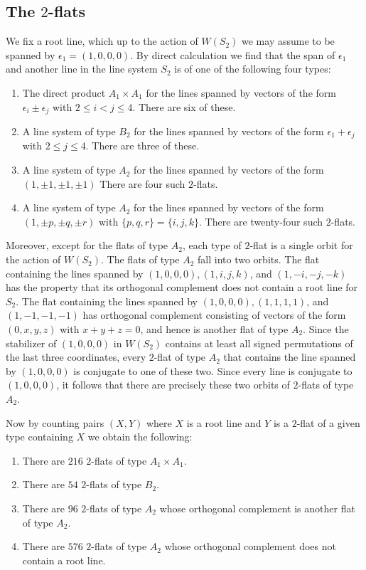 \documentclass[11pt, reqno]{amsart}
\numberwithin{equation}{section}
\theoremstyle{definition}
\theoremstyle{plain}
\begin{document}
\subsection{The $2$-flats} We fix a root line, which up to the action of $W(S_2)$ we may assume to be spanned by $\epsilon_1=(1,0,0,0)$. By direct calculation we find that the span of $\epsilon_1$ and another line in the line system $S_2$ is of one of the following four types:
\begin{enumerate}
\item[(a)] The direct product $A_1 \times A_1$ for the lines spanned by vectors of the form $\epsilon_i \pm \epsilon_j$ with $2 \leq i < j \leq 4$. There are six of these.
\item[(b)] A line system of type $B_2$ for the lines spanned by vectors of the form $\epsilon_1 + \epsilon_j$ with $2 \leq j \leq 4$. There are three of these.
\item[(c)] A line system of type $A_2$ for the lines spanned by vectors of the form $(1,\pm 1,\pm 1, \pm 1)$  There are four such $2$-flats.
\item[(d)] A line system of type $A_2$ for the lines spanned by vectors of the form $(1, \pm p,\pm q,\pm r)$ with $\{p,q,r\}=\{i,j,k\}$. There are twenty-four such $2$-flats.
\end{enumerate} Moreover, except for the flats of type $A_2$, each type of $2$-flat is a single orbit for the action of $W(S_2)$. The flats of type $A_2$ fall into two orbits. The flat containing the lines spanned by $(1,0,0,0),(1,i,j,k)$, and $(1,-i,-j,-k)$ has the property that its orthogonal complement does not contain a root line for $S_2$. The flat containing the lines spanned by $(1,0,0,0),(1,1,1,1)$, and $(1,-1,-1,-1)$ has orthogonal complement consisting of vectors of the form $(0,x,y,z)$ with $x+y+z=0$, and hence is another flat of type $A_2$. Since the stabilizer of $(1,0,0,0)$ in $W(S_2)$ contains at least all signed permutations of the last three coordinates, every $2$-flat of type $A_2$ that contains the line spanned by $(1,0,0,0)$ is conjugate to one of these two. Since every line is conjugate to $(1,0,0,0)$, it follows that there are precisely these two orbits of $2$-flats of type $A_2$.

Now by counting pairs $(X,Y)$ where $X$ is a root line and $Y$ is a $2$-flat of a given type containing $X$ we obtain the following:

\begin{enumerate}
\item[(a)] There are $216$ $2$-flats of type $A_1 \times A_1$.
\item[(b)] There are $54$ $2$-flats of type $B_2$.
\item[(c)] There are $96$ $2$-flats of type $A_2$ whose orthogonal complement is another flat of type $A_2$.
\item[(d)] There are $576$ $2$-flats of type $A_2$ whose orthogonal complement does not contain a root line.
\end{enumerate}
\end{document}

